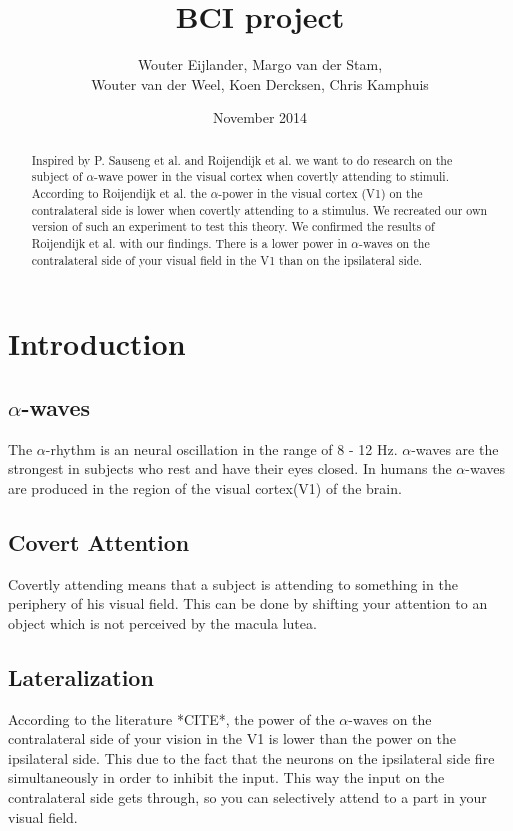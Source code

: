 \documentclass{article}
\title{BCI project}
\author{Wouter Eijlander, Margo van der Stam, 
				\\Wouter van der Weel, Koen Dercksen, Chris Kamphuis}
\date{November 2014}
\begin{document}
\maketitle
\begin{abstract}
	Inspired by P. Sauseng et al.\cite{Sauseng2005} and Roijendijk et al.
	\cite{Jason} we want to do research on
	the subject of $\alpha$-wave power in the visual cortex when covertly
	attending to stimuli. According to Roijendijk et al. \cite{Jason} the
	$\alpha$-power in the visual cortex (V1) on the contralateral side is lower when
	covertly attending to a stimulus. We recreated our own version of such an
	experiment to test this theory. We confirmed the results of Roijendijk et al.
	\cite{Jason} with our findings. There is a lower power in $\alpha$-waves on
	the contralateral side of your visual field in the V1 than on the ipsilateral
	side. 
\end{abstract}

\section{Introduction}
\subsection{$\alpha$-waves}
The $\alpha$-rhythm is an neural oscillation in the range of 8 - 12 Hz. 
$\alpha$-waves are the strongest in subjects who rest and have their eyes
closed. In humans the $\alpha$-waves are produced in the region of the visual
cortex(V1) of the brain. 
\subsection{Covert Attention}
Covertly attending means that a subject is attending to something in the
periphery of his visual field. This can be done by shifting your attention to
an object which is not perceived by the macula lutea.
\subsection{Lateralization}
According to the literature *CITE*, the power of the $\alpha$-waves on the
contralateral side of your vision in the V1 is lower than the power on the
ipsilateral side. This due to the fact that the neurons on the ipsilateral side
fire simultaneously in order to inhibit the input. This way the input on the
contralateral side gets through, so you can selectively attend to a part in
your visual field. %
\end{document}
